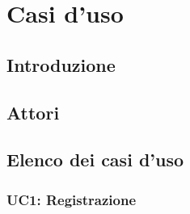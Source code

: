 \section{Casi d'uso}
\subsection{Introduzione}


\subsection{Attori}

\subsection{Elenco dei casi d'uso}
\subsubsection{UC1: Registrazione}
